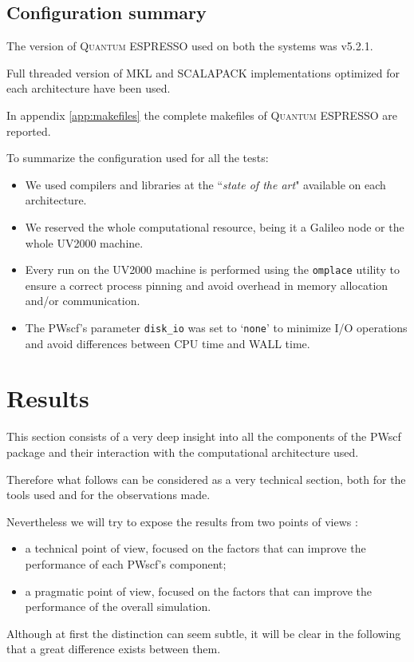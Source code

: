 \documentclass[a4paper,12pt]{article}
\newcommand\QE{\textsc{Quantum} ESPRESSO }
\begin{document}
\subsection{Configuration summary}\label{sec:ConfSummary}

The version of \QE used on both the systems was v5.2.1.

Full threaded version of MKL and SCALAPACK implementations optimized for each architecture have been used.

In appendix \ref{app:makefiles} the complete makefiles of \QE are reported.

To summarize the configuration used for all the tests:
\begin{itemize}
	\item We used compilers and libraries at the ``\textit{state of the art}" available on each architecture.
	\item We reserved the whole computational resource, being it a Galileo node or the whole UV2000 machine.
	\item Every run on the UV2000 machine is performed using the \texttt{omplace} utility to ensure a correct process pinning and avoid overhead in memory allocation and/or communication.
	\item The PWscf's parameter \texttt{disk\_io} was set to `\texttt{none}' to minimize I/O operations and avoid differences between CPU time and WALL time.
\end{itemize}

\newpage




\section{Results}
This section consists of a very deep insight into all the components of the PWscf package and their interaction with the computational architecture used.

Therefore what follows can be considered as a very technical section, both for the tools used and for the observations made.

Nevertheless we will try to expose the results from two points of views :
\begin{itemize}
	\item a technical point of view, focused on the factors that can improve the performance of each PWscf's component;
	\item a pragmatic point of view, focused on the factors that can improve the performance of the overall simulation.
\end{itemize}
Although at first the distinction can seem subtle, it will be clear in the following that a great difference exists between them.
\end{document}
